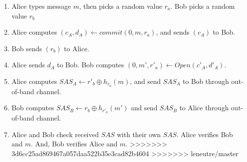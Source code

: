 \begin{enumerate}
\begin{enumerate}
\begin{enumerate}
\item Alice types message $m$, then picks a random value $r_a$. Bob  picks a random value $r_b$
\item Alice computes $(c_A,d_A) \leftarrow commit(0,m,r_a)$, and sends $(c_A)$ to Bob.
\item Bob sends $(r_b)$ to Alice.
\item Alice sends $d_A$ to Bob. Bob computes $(0,m',r'_a) \leftarrow Open(c'_A,d'_A)$. 
\item Alice computes $SAS_A \leftarrow r'_b \oplus h_{r_a}(m)$, and send $SAS_A$ to Bob through out-of-band channel. 
\item Bob computes $SAS_B \leftarrow r_b \oplus h_{r'_a}(m')$ and send $SAS_B$ to Alice through out-of-band channel. 
\item Alice and Bob check received $SAS$ with their own $SAS$. Alice verifies Bob and $m$. And, Bob verifies Alice and $m$.
>>>>>>> 3d6cc25ad869467a057daa522b35e3cad82b4604
>>>>>>> leneutre/master
\end{enumerate}


\end{enumerate}
\end{enumerate}
